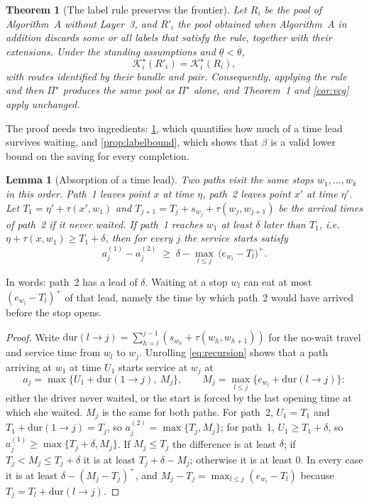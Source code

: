 \documentclass[11pt]{article}
\newtheorem{theorem}{Theorem}
\newtheorem{lemma}{Lemma}
\theoremstyle{definition}
\theoremstyle{remark}
\newcommand{\Ks}{\mathcal{K}^{\star}}
\newcommand{\thl}{\underline{\theta}}
\newcommand{\thu}{\overline{\theta}}
\begin{document}
\begin{theorem}[The label rule preserves the frontier]\label{thm:preserve}
Let $R_i$ be the pool of Algorithm~A without Layer~3, and $R'_i$ the pool
obtained when Algorithm~A in addition discards some or all labels that satisfy
the rule, together with their extensions. Under the standing assumptions and
$\thl<\thu$,
\[
\Ks_i(R'_i)=\Ks_i(R_i),
\]
with routes identified by their bundle and pair. Consequently, applying the
rule and then $\Pi^\star$ produces the same pool as $\Pi^\star$ alone, and
Theorem~1 and \cref{cor:vcg} apply unchanged.
\end{theorem}

The proof needs two ingredients: \cref{lem:absorb}, which quantifies how much
of a time lead survives waiting, and \cref{prop:labelbound}, which shows that
$\beta$ is a valid lower bound on the saving for every completion.

\begin{lemma}[Absorption of a time lead]\label{lem:absorb}
Two paths visit the same stops $w_1,\dots,w_k$ in this order. Path~1 leaves
point $x$ at time $\eta$, path~2 leaves point $x'$ at time $\eta'$. Let
$T_1=\eta'+\tau(x',w_1)$ and $T_{j+1}=T_j+s_{w_j}+\tau(w_j,w_{j+1})$ be the
arrival times of path~2 if it never waited. If path~1 reaches $w_1$ at least
$\delta$ later than $T_1$, i.e.\ $\eta+\tau(x,w_1)\ge T_1+\delta$, then for every
$j$ the service starts satisfy
\[
a^{(1)}_j-a^{(2)}_j\;\ge\;\delta-\max_{l\le j}\,\bigl(e_{w_l}-T_l\bigr)^+ .
\]
\end{lemma}

In words: path~2 has a lead of $\delta$. Waiting at a stop $w_l$ can eat at
most $(e_{w_l}-T_l)^+$ of that lead, namely the time by which path~2 would have
arrived before the stop opens.

\begin{proof}
Write $\mathrm{dur}(l\to j)=\sum_{h=l}^{j-1}(s_{w_h}+\tau(w_h,w_{h+1}))$ for the
no-wait travel and service time from $w_l$ to $w_j$. Unrolling
\eqref{eq:recursion} shows that a path arriving at $w_1$ at time $U_1$ starts
service at $w_j$ at
\[
a_j=\max\bigl\{U_1+\mathrm{dur}(1\to j),\ M_j\bigr\},\qquad
M_j=\max_{l\le j}\bigl\{e_{w_l}+\mathrm{dur}(l\to j)\bigr\}:
\]
either the driver never waited, or the start is forced by the last opening time
at which she waited. $M_j$ is the same for both paths. For path~2,
$U_1=T_1$ and $T_1+\mathrm{dur}(1\to j)=T_j$, so $a^{(2)}_j=\max\{T_j,M_j\}$; for
path~1, $U_1\ge T_1+\delta$, so $a^{(1)}_j\ge\max\{T_j+\delta,M_j\}$. If
$M_j\le T_j$ the difference is at least $\delta$; if $T_j<M_j\le T_j+\delta$ it
is at least $T_j+\delta-M_j$; otherwise it is at least $0$. In every case it is
at least $\delta-(M_j-T_j)^+$, and $M_j-T_j=\max_{l\le j}(e_{w_l}-T_l)$ because
$T_j=T_l+\mathrm{dur}(l\to j)$.
\end{proof}
\end{document}
